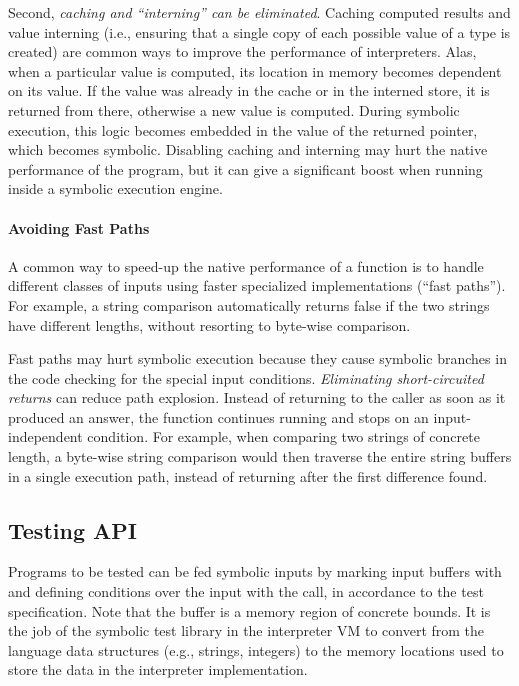 Second, \emph{caching and ``interning'' can be eliminated}.  Caching computed results and value interning (i.e., ensuring that a single copy of each possible value of a type is created) are common ways to improve the performance of interpreters.  Alas, when a particular value is computed, its location in memory becomes dependent on its value. If the value was already in the cache or in the interned store, it is returned from there, otherwise a new value is computed.  During symbolic execution, this logic becomes embedded in the value of the returned pointer, which becomes symbolic.  Disabling caching and interning may hurt the native performance of the program, but it can give a significant boost when running inside a symbolic execution engine.

\paragraph{Avoiding Fast Paths}

A common way to speed-up the native performance of a function is to handle different classes of inputs using faster specialized implementations (``fast paths'').  For example, a string comparison automatically returns false if the two strings have different lengths, without resorting to byte-wise comparison.

Fast paths may hurt symbolic execution because they cause symbolic branches in the code checking for the special input conditions.  \emph{Eliminating short-circuited returns} can reduce path explosion.  Instead of returning to the caller as soon as it produced an answer, the function continues running and stops on an input-independent condition.  For example, when comparing two strings of concrete length, a byte-wise string comparison would then traverse the entire string buffers in a single execution path, instead of returning after the first difference found.

\subsection{Testing API}
\label{sec:chef:testingAPI}

Programs to be tested can be fed symbolic inputs by marking input buffers with  and defining conditions over the input with the  call, in accordance to the test specification.  Note that the buffer is a memory region of concrete bounds.  It is the job of the symbolic test library in the interpreter VM to convert from the language data structures (e.g., strings, integers) to the memory locations used to store the data in the interpreter implementation.


